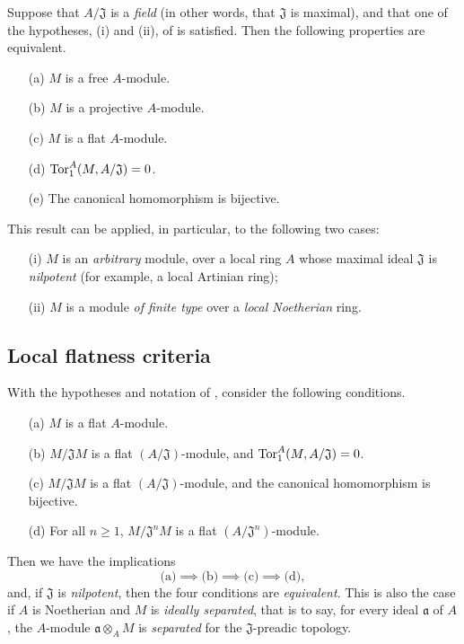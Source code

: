 \begin{env}[10.1.3]
\label{0.10.1.3}
Suppose that $A/\mathfrak{J}$ is a \emph{field} (in other words, that $\mathfrak{J}$ is maximal), and that one of the hypotheses, (i) and (ii), of  is satisfied.
Then the following properties are equivalent.
\begin{enumerate}
  \item[(a)] $M$ is a free $A$-module.
  \item[(b)] $M$ is a projective $A$-module.
  \item[(c)] $M$ is a flat $A$-module.
  \item[(d)] $\operatorname{Tor}_1^A(M,A/\mathfrak{J})=0$.
  \item[(e)] The canonical homomorphism  is bijective.
\end{enumerate}

This result can be applied, in particular, to the following two cases:
\begin{enumerate}
  \item[(i)] $M$ is an \emph{arbitrary} module, over a local ring $A$ whose maximal ideal $\mathfrak{J}$ is \emph{nilpotent} (for example, a local Artinian ring);
  \item[(ii)] $M$ is a module \emph{of finite type} over a \emph{local Noetherian} ring.
\end{enumerate}
\end{env}

\subsection{Local flatness criteria}
\label{subsection:0.10.2}

\begin{env}[10.2.1]
\label{0.10.2.1}
With the hypotheses and notation of , consider the following conditions.
\begin{enumerate}
    \item[(a)] $M$ is a flat $A$-module.
    \item[(b)] $M/\mathfrak{J}M$ is a flat $(A/\mathfrak{J})$-module, and $\operatorname{Tor}_1^A(M,A/\mathfrak{J})=0$.
    \item[(c)] $M/\mathfrak{J}M$ is a flat $(A/\mathfrak{J})$-module, and the canonical homomorphism  is bijective.
    \item[(d)] For all $n\geq1$, $M/\mathfrak{J}^nM$ is a flat $(A/\mathfrak{J}^n)$-module.
\end{enumerate}

Then we have the implications
\[
  \text{(a)}\implies\text{(b)}\implies\text{(c)}\implies\text{(d)},
\]
and, if $\mathfrak{J}$ is \emph{nilpotent}, then the four conditions are \emph{equivalent}.
This is also the case if $A$ is Noetherian and $M$ is \emph{ideally separated}, that is to say, for every ideal $\mathfrak{a}$ of $A$, the $A$-module $\mathfrak{a}\otimes_A M$ is \emph{separated} for the $\mathfrak{J}$-preadic topology.
\end{env}

